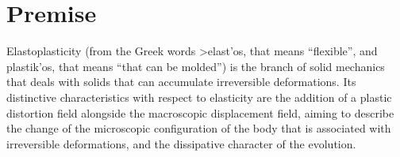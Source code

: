 \documentclass[a4paper,10pt,oneside]{amsbook}
\numberwithin{section}{chapter}
\numberwithin{equation}{chapter}
\theoremstyle{definition}
\begin{document}
% 

\chapter*{Premise}

Elastoplasticity (from the Greek words \foreignlanguage{greek}{>elast'os}, that means ``flexible'', and \foreignlanguage{greek}{plastik'os}, that means ``that can be molded'') is the branch of solid mechanics that deals with solids that can accumulate irreversible deformations. Its distinctive characteristics with respect to elasticity are the addition of a plastic distortion field alongside the macroscopic displacement field, aiming to describe the change of the microscopic configuration of the body that is associated with irreversible deformations, and the dissipative character of the evolution.
\end{document}
